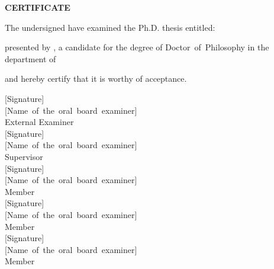 
\begin{center}\Large{\textbf{CERTIFICATE}}\end{center}
\vspace{0.5cm}

{\selectfont
	\noindent The undersigned have examined the Ph.D. thesis entitled:}
\vspace{0.5cm}
\begin{center}\textbf{\thesistitle}\end{center}
\vspace{0.5cm}
{\selectfont
	presented by  \studentname, a candidate for the degree of \mbox{Doctor of Philosophy} in the department of \subject, and hereby certify that it is worthy of acceptance.
	
	\vspace{1.3cm}
	\parbox{0.6\textwidth}{ 
		\flushleft{[Date]}
		\vspace{16cm}
	}
	\hfill 
	\parbox{0.4\textwidth}{
		\mbox{[Signature]} \\
		\mbox{[Name of the oral board examiner]}\\
		External Examiner\\
		
		\vspace{1.3cm}
		\mbox{[Signature]}\\
		\mbox{[Name of the oral board examiner]}\\
		Supervisor\\
		
		\vspace{1.3cm}
		\mbox{[Signature]}\\
		\mbox{[Name of the oral board examiner]}\\
		Member\\
		
		\vspace{1.3cm}
		\mbox{[Signature]}\\
		\mbox{[Name of the oral board examiner]}\\
		Member\\
		
		\vspace{1.3cm}
		\mbox{[Signature]}\\
		\mbox{[Name of the oral board examiner]}\\
		Member\\
	}
}